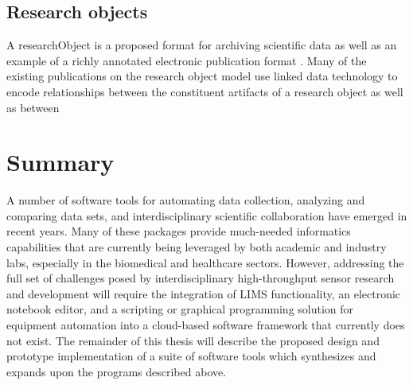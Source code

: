 \documentclass[../thesis]{subfiles}
\begin{document}
\subsection{Research objects}
A \gls{researchObject} is a proposed format for archiving scientific
data as well as an example of a richly annotated electronic
publication format \cite{bechhofer2010research}. Many of the existing
publications on the research object model use linked data technology
to encode relationships between the constituent artifacts of a
research object as well as between



\section{Summary}
A number of software tools for automating data collection, analyzing
and comparing data sets, and interdisciplinary scientific
collaboration have emerged in recent years. Many of these packages
provide much-needed informatics capabilities that are currently being
leveraged by both academic and industry labs, especially in the
biomedical and healthcare sectors. However, addressing the full set of
challenges posed by interdisciplinary high-throughput sensor research
and development will require the integration of \gls{LIMS}
functionality, an electronic notebook editor, and a scripting or
graphical programming solution for equipment automation into a
cloud-based software framework that currently does not exist. The
remainder of this thesis will describe the proposed design and
prototype implementation of a suite of software tools which
synthesizes and expands upon the programs described above.
\end{document}
